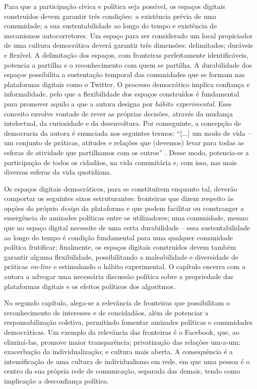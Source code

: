 \documentclass[portuguese]{textolivre}
\begin{document}
Para que a participação cívica e política seja possível, os espaços digitais construídos devem garantir três condições: a existência prévia de uma comunidade; a sua sustentabilidade ao longo do tempo e existência de mecanismos autocorretores. Um espaço para ser considerado um local propiciador de uma cultura democrática deverá garantir três dimensões: delimitados; duráveis e flexível. A delimitação dos espaços, com fronteiras perfeitamente identificáveis, potencia a partilha e o reconhecimento com quem se partilha. A durabilidade dos espaços possibilita a sustentação temporal das comunidades que se formam nas plataformas digitais como o Twitter. O processo democrático implica confiança e informalidade, pelo que a flexibilidade dos espaços construídos é fundamental para promover aquilo a que a autora designa por \textit{hábito experimental}. Esse conceito envolve vontade de rever as próprias decisões, através da mudança intelectual, da curiosidade e da desenvoltura. Por conseguinte, a concepção de democracia da autora é enunciada nos seguintes termos: “[...] um modo de vida – um conjunto de práticas, atitudes e relações que (devemos) levar para todas as esferas de atividade que partilhamos com os outros” \cite[p. 24, tradução nossa]{forestal_designing_2021}. Desse modo, potencia-se a participação de todos os cidadãos, na vida comunitária e, com isso, nas mais diversas esferas da vida quotidiana.

Os espaços digitais democráticos, para se constituírem enquanto tal, deverão comportar os seguintes eixos estruturantes: fronteiras que dizem respeito às opções do próprio \textit{design} da plataforma e que podem facilitar ou constranger a emergência de amizades políticas entre os utilizadores; uma comunidade, mesmo que no espaço digital necessite de uma certa durabilidade – essa sustentabilidade ao longo do tempo é condição fundamental para uma qualquer comunidade política frutificar; finalmente, os espaços digitais construídos devem também garantir alguma flexibilidade, possibilitando a maleabilidade e diversidade de práticas \textit{on-line} e estimulando o hábito experimental. O capítulo encerra com a autora a advogar uma necessária discussão política sobre a propriedade das plataformas digitais e os efeitos políticos dos algoritmos.

No segundo capítulo, alega-se a relevância de fronteiras que possibilitam o reconhecimento de interesses e de concidadãos, além de potenciar a responsabilização coletiva, permitindo fomentar amizades políticas e comunidades democráticas. Um exemplo da relevância das fronteiras é o Facebook, que, ao eliminá-las, promove maior transparência; privatização das relações um-a-um; exacerbação da individualização; e cultura mais aberta. A consequência é a intensificação de uma cultura de individualismo em rede, em que uma pessoa é o centro da sua própria rede de comunicação, separada das demais, tendo como implicação a desconfiança política.
\end{document}

